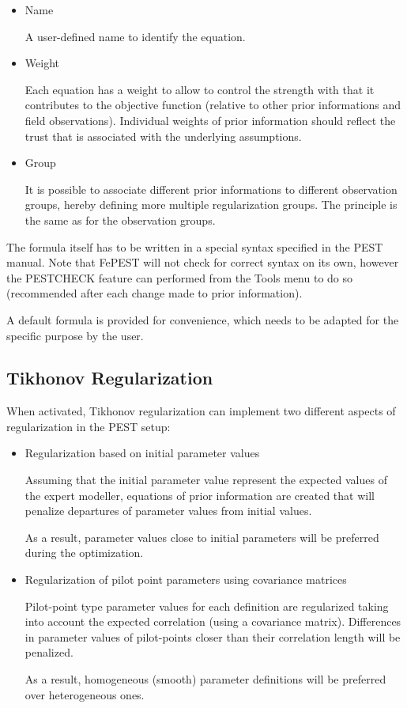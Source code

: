 \begin{itemize}

\item Name

A user-defined name to identify the equation.

\item Weight 

Each equation has a weight to allow to control the strength with that it contributes to the objective function (relative to other prior informations and field observations). Individual weights of prior information should reflect the trust that is associated with the underlying assumptions.

\item Group

It is possible to associate different prior informations to different observation groups, hereby defining more multiple regularization groups. The principle is the same as for the observation groups.

\end{itemize}

The formula itself has to be written in a special syntax specified in the PEST manual. Note that FePEST will not check for correct syntax on its own, however the PESTCHECK feature can performed from the Tools menu to do so (recommended after each change made to prior information).

A default formula is provided for convenience, which needs to be adapted for the specific purpose by the user.

\subsection{Tikhonov Regularization}

When activated, Tikhonov regularization can implement two different aspects of regularization in the PEST setup:

\begin{itemize}

\item Regularization based on initial parameter values

Assuming that the initial parameter value represent the expected values of the expert modeller, equations of prior information are created that will penalize departures of parameter values from initial values.

As a result, parameter values close to initial parameters will be preferred during the optimization.

\item Regularization of pilot point parameters using covariance matrices

Pilot-point type parameter values for each definition are regularized taking into account the expected correlation (using a covariance matrix). Differences in parameter values of pilot-points closer than their correlation length will be penalized.

As a result, homogeneous (smooth) parameter definitions will be preferred over heterogeneous ones.

\end{itemize}

